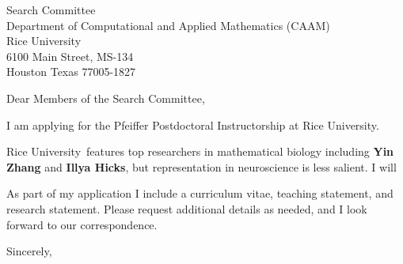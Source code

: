 \documentclass[11pt,a4paper]{letter}
\begin{document}

\def\School{Rice University}

\begin{letter}
{Search Committee\\
Department of Computational and Applied Mathematics (CAAM)\\
Rice University\\
6100 Main Street, MS-134\\
Houston Texas 77005-1827
}


\opening{Dear Members of the Search Committee,}

I am applying for the Pfeiffer Postdoctoral Instructorship at \School. 



\School~features top researchers in mathematical biology including \textbf{Yin Zhang} and \textbf{Illya Hicks}, but representation in neuroscience is less salient. I will 



As part of my application I include a curriculum vitae, teaching statement, and research statement. Please request additional details as needed, and I look forward to our correspondence.

\closing{Sincerely,}
\end{letter}
\end{document}
